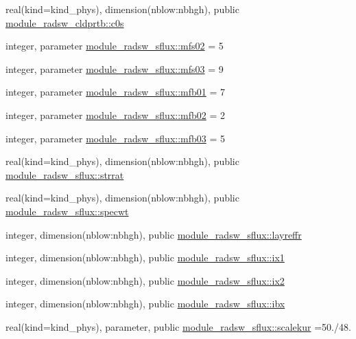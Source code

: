 \begin{DoxyCompactItemize}
\item 
real(kind=kind\+\_\+phys), dimension(nblow\+:nbhgh), public \hyperlink{group__module__radsw__main_gaab7693c5f31ce2182bca61aff77996bc}{module\+\_\+radsw\+\_\+cldprtb\+::c0s}
\item 
integer, parameter \hyperlink{group__module__radsw__main_gacca3bbc0dd125a3e8c3734c58c48e79b}{module\+\_\+radsw\+\_\+sflux\+::mfs02} = 5
\item 
integer, parameter \hyperlink{group__module__radsw__main_ga5bd55a5106ce82bd47250d38d9b8f22a}{module\+\_\+radsw\+\_\+sflux\+::mfs03} = 9
\item 
integer, parameter \hyperlink{group__module__radsw__main_ga08a0f1278962ac27634169ea7632bc70}{module\+\_\+radsw\+\_\+sflux\+::mfb01} = 7
\item 
integer, parameter \hyperlink{group__module__radsw__main_gafdf71cabed6ae0076d98ff0e563dbc61}{module\+\_\+radsw\+\_\+sflux\+::mfb02} = 2
\item 
integer, parameter \hyperlink{group__module__radsw__main_ga2e3b510d781c596fa0bb9b1359a988dd}{module\+\_\+radsw\+\_\+sflux\+::mfb03} = 5
\item 
real(kind=kind\+\_\+phys), dimension(nblow\+:nbhgh), public \hyperlink{group__module__radsw__main_gaee2a2275da028b0960c5c1c8a34f46cf}{module\+\_\+radsw\+\_\+sflux\+::strrat}
\item 
real(kind=kind\+\_\+phys), dimension(nblow\+:nbhgh), public \hyperlink{group__module__radsw__main_ga7d1a386e92555bcb09239ab098d8b398}{module\+\_\+radsw\+\_\+sflux\+::specwt}
\item 
integer, dimension(nblow\+:nbhgh), public \hyperlink{group__module__radsw__main_ga90c56da1bcadbea0b42e12487c1c1eec}{module\+\_\+radsw\+\_\+sflux\+::layreffr}
\item 
integer, dimension(nblow\+:nbhgh), public \hyperlink{group__module__radsw__main_gac2864b4501e9bc3804d45d14f4aab472}{module\+\_\+radsw\+\_\+sflux\+::ix1}
\item 
integer, dimension(nblow\+:nbhgh), public \hyperlink{group__module__radsw__main_ga92703c3e826f7e81267c6b7ae31ebe42}{module\+\_\+radsw\+\_\+sflux\+::ix2}
\item 
integer, dimension(nblow\+:nbhgh), public \hyperlink{group__module__radsw__main_gacb1498ecf044449dbe6d7a5630fdc375}{module\+\_\+radsw\+\_\+sflux\+::ibx}
\item 
real(kind=kind\+\_\+phys), parameter, public \hyperlink{group__module__radsw__main_ga2f3280a36f27cea89fc66d71e799cf6d}{module\+\_\+radsw\+\_\+sflux\+::scalekur} =50./48.

\end{DoxyCompactItemize}
